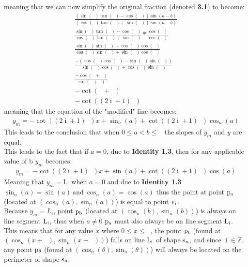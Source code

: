 \documentclass[11pt]{article}
\DeclareMathOperator{\custi}{\mathrm{i}}
\DeclareMathOperator{\period}{\frac{2\pi}{n}}
\DeclareMathOperator{\hp}{\frac{\pi}{n}}
\DeclareMathOperator{\iperiod}{\frac{2\custi\pi}{n}}
\begin{document}
meaning that we can now simplify the original fraction (denoted \textbf{3.1}) to become:
\begin{gather*}
\frac{(\sin(\iperiod)\tan(\hp)-\cos(\iperiod))\sin(a-b)}{(\cos(\iperiod)\tan(\hp)+\sin(\iperiod))\sin(a-b)}\\
\frac{\sin(\iperiod)\tan(\hp)-\cos(\iperiod)}{\cos(\iperiod)\tan(\hp)+\sin(\iperiod)} * \frac{\cos(\hp)}{\cos(\hp)}\\
\frac{\sin(\iperiod)\sin(\hp)-\cos(\iperiod)\cos(\hp)}{\cos(\iperiod)\sin(\hp)+\sin(\iperiod)\cos(\hp)}\\
\frac{-(\cos(\iperiod)\cos(\hp)-\sin(\iperiod)\sin(\hp))}{\sin(\hp)\cos(\iperiod)+\cos(\hp)\sin(\iperiod)}\\
\frac{-\cos(\iperiod+\hp)}{\sin(\iperiod+\hp)}\\
-\cot(\iperiod+\hp)\\
-\cot((2\custi+1)\hp)
\end{gather*}
meaning that the equation of the "modified" line becomes:
\begin{gather*}
y_m=-\cot((2\custi+1)\hp)x+\sin_n(a)+\cot((2\custi+1)\hp)\cos_n(a)
\end{gather*}
This leads to the conclusion that when \(0\leq a<b\leq\period\) the slopes of \(y_m\) and \(y\) are equal. \\
This leads to the fact that if \(a=0\), due to \textbf{Identity 1.3}, then for any applicable value of b \(y_m\) becomes:
\begin{gather*}
y_m=-\cot((2\custi+1)\hp)x+\sin(a)+\cot((2\custi+1)\hp)\cos(a)
\end{gather*}
Meaning that \(y_m=\mathrm{L_i}\) when \(a=0\) and due to \textbf{Identity 1.3} \(\sin_n(a)=\sin(a) \mathrm{\ and\ } \cos_n(a)=\cos(a)\) thus the point at point \(\rm p_a\) (located at \((\cos_n(a), \sin_n(a))\)) is equal to point \(\rm v_i\).\\
Because \(y_m = L_i\), point \(\rm p_b\) (located at \((\cos_n(b),\sin_n(b))\)) is always on line segment \(\rm L_i\), thus when \(a\neq0\) \(\rm p_a\) must also always be on line segment \(\rm L_i\).\\
This means that for any value \(x\) where \(0\leq x \leq\period\), the point \(\rm p_t\) (found at \((\cos_n(x+\iperiod),\sin_n(x+\iperiod))\)) falls on line \(\rm L_i\) of shape \(\rm s_n\), and since \(\custi\in\mathbb{Z}\), any point \(\rm p_\theta\) (found at \((\cos_n(\theta),\sin_n(\theta))\)) will always be located on the perimeter of shape \(\rm s_n\).
\end{document}
